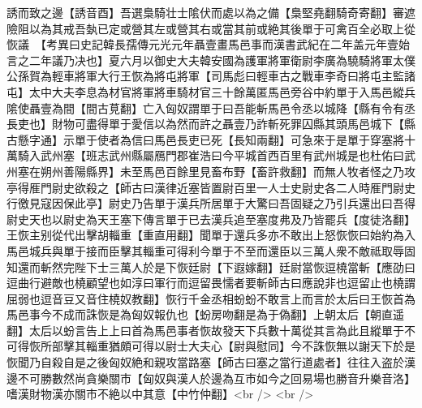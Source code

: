 誘而致之邊【誘音酉】吾選梟騎壮士隂伏而處以為之備【梟堅堯翻騎奇寄翻】審遮險阻以為其戒吾埶已定或營其左或營其右或當其前或絶其後單于可禽百全必取上從恢議　【考異曰史記韓長孺傳元光元年聶壹畫馬邑事而漢書武紀在二年盖元年壹始言之二年議乃决也】夏六月以御史大夫韓安國為護軍將軍衛尉李廣為驍騎將軍太僕公孫賀為輕車將軍大行王恢為將屯將軍【司馬彪曰輕車古之戰車李奇曰將屯主監諸屯】太中大夫李息為材官將軍將車騎材官三十餘萬匿馬邑旁谷中約單于入馬邑縱兵隂使聶壹為間【間古莧翻】亡入匈奴謂單于曰吾能斬馬邑令丞以城降【縣有令有丞長吏也】財物可盡得單于愛信以為然而許之聶壹乃詐斬死罪囚縣其頭馬邑城下【縣古懸字通】示單于使者為信曰馬邑長吏已死【長知兩翻】可急來于是單于穿塞將十萬騎入武州塞【班志武州縣屬鴈門郡崔浩曰今平城首西百里有武州城是也杜佑曰武州塞在朔州善陽縣界】未至馬邑百餘里見畜布野【畜許救翻】而無人牧者怪之乃攻亭得㕍門尉史欲殺之【師古曰漢律近塞皆置尉百里一人士史尉史各二人時㕍門尉史行徼見寇因保此亭】尉史乃告單于漢兵所居單于大驚曰吾固疑之乃引兵還出曰吾得尉史天也以尉史為天王塞下傳言單于已去漢兵追至塞度弗及乃皆罷兵【度徒洛翻】王恢主别從代出擊胡輜重【重直用翻】聞單于還兵多亦不敢出上怒恢恢曰始約為入馬邑城兵與單于接而臣擊其輜重可得利今單于不至而還臣以三萬人衆不敵祗取辱固知還而斬然完陛下士三萬人於是下恢廷尉【下遐嫁翻】廷尉當恢逗橈當斬【應劭曰逗曲行避敵也橈顧望也如淳曰軍行而逗留畏懦者要斬師古曰應說非也逗留止也橈謂屈弱也逗音豆又音住橈奴教翻】恢行千金丞相蚡蚡不敢言上而言於太后曰王恢首為馬邑事今不成而誅恢是為匈奴報仇也【蚡房吻翻是為于偽翻】上朝太后【朝直遥翻】太后以蚡言告上上曰首為馬邑事者恢故發天下兵數十萬從其言為此且縱單于不可得恢所部擊其輜重猶頗可得以尉士大夫心【尉與慰同】今不誅恢無以謝天下於是恢聞乃自殺自是之後匈奴絶和親攻當路塞【師古曰塞之當行道處者】往往入盗於漢邊不可勝數然尚貪樂關市【匈奴與漢人於邊為互市如今之回易場也勝音升樂音洛】嗜漢財物漢亦關市不絶以中其意【中竹仲翻】<br />
<br />

